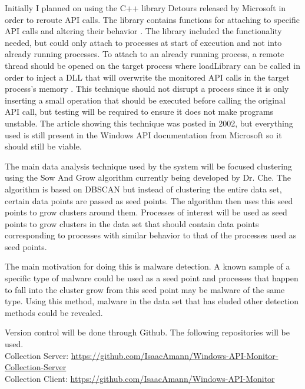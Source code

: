 \documentclass[titlepage]{article}
\begin{document}
\begin{flushleft}
Initially I planned on using the C++ library Detours released by Microsoft in order to reroute API calls. The library contains functions for attaching to specific API calls and altering their behavior \cite{detours}. The library included the functionality needed, but could only attach to processes at start of execution and not into already running processes. To attach to an already running process, a remote thread should be opened on the target process where loadLibrary can be called in order to inject a DLL that will overwrite the monitored API calls in the target process's memory \cite{hookingSample}. This technique should not disrupt a process since it is only inserting a small operation that should be executed before calling the original API call, but testing will be required to ensure it does not make programs unstable. The article showing this technique was posted in 2002, but everything used is still present in the Windows API documentation from Microsoft so it should still be viable.
\end{flushleft}

\begin{flushleft}
The main data analysis technique used by the system will be focused clustering using the Sow And Grow algorithm currently being developed by Dr. Che. The algorithm is based on DBSCAN but instead of clustering the entire data set, certain data points are passed as seed points. The algorithm then uses this seed points to grow clusters around them. Processes of interest will be used as seed points to grow clusters in the data set that should contain data points corresponding to processes with similar behavior to that of the processes used as seed points.
\end{flushleft}
\begin{flushleft}
    The main motivation for doing this is malware detection. A known sample of a specific type of malware could be used as a seed point and processes that happen to fall into the cluster grow from this seed point may be malware of the same type. Using this method, malware in the data set that has eluded other detection methods could be revealed. 
\end{flushleft}

\begin{flushleft}
    Version control will be done through Github. The following repositories will be used.\\
    Collection Server: \url{https://github.com/IsaacAmann/Windows-API-Monitor-Collection-Server}\\
    Collection Client: \url{https://github.com/IsaacAmann/Windows-API-Monitor}
\end{flushleft}
\end{document}
